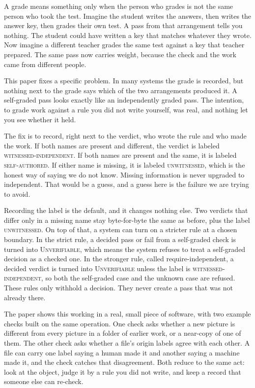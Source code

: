 \documentclass[11pt]{article}
\begin{document}
A grade means something only when the person who grades is not the same person who took the test. Imagine the student writes the answers, then writes the answer key, then grades their own test. A pass from that arrangement tells you nothing. The student could have written a key that matches whatever they wrote. Now imagine a different teacher grades the same test against a key that teacher prepared. The same pass now carries weight, because the check and the work came from different people.

This paper fixes a specific problem. In many systems the grade is recorded, but nothing next to the grade says which of the two arrangements produced it. A self-graded pass looks exactly like an independently graded pass. The intention, to grade work against a rule you did not write yourself, was real, and nothing let you see whether it held.

The fix is to record, right next to the verdict, who wrote the rule and who made the work. If both names are present and different, the verdict is labeled \textsc{witnessed-independent}. If both names are present and the same, it is labeled \textsc{self-authored}. If either name is missing, it is labeled \textsc{unwitnessed}, which is the honest way of saying we do not know. Missing information is never upgraded to independent. That would be a guess, and a guess here is the failure we are trying to avoid.

Recording the label is the default, and it changes nothing else. Two verdicts that differ only in a missing name stay byte-for-byte the same as before, plus the label \textsc{unwitnessed}. On top of that, a system can turn on a stricter rule at a chosen boundary. In the strict rule, a decided pass or fail from a self-graded check is turned into \textsc{Unverifiable}, which means the system refuses to treat a self-graded decision as a checked one. In the stronger rule, called require-independent, a decided verdict is turned into \textsc{Unverifiable} unless the label is \textsc{witnessed-independent}, so both the self-graded case and the unknown case are refused. These rules only withhold a decision. They never create a pass that was not already there.

The paper shows this working in a real, small piece of software, with two example checks built on the same operation. One check asks whether a new picture is different from every picture in a folder of earlier work, or a near-copy of one of them. The other check asks whether a file's origin labels agree with each other. A file can carry one label saying a human made it and another saying a machine made it, and the check catches that disagreement. Both reduce to the same act: look at the object, judge it by a rule you did not write, and keep a record that someone else can re-check.
\end{document}
